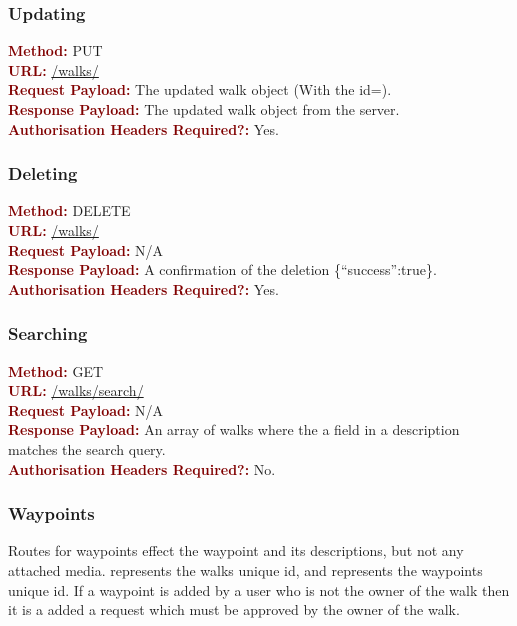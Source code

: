 \documentclass[11pt,a4paper]{report}
\begin{document}
\subsubsection{Updating}
\textbf{\textcolor{Maroon}{Method:}} PUT\\
\textbf{\textcolor{Maroon}{URL:}} \url{/walks/}\\
\textbf{\textcolor{Maroon}{Request Payload:}} The updated walk object (With the id=).\\
\textbf{\textcolor{Maroon}{Response Payload:}} The updated walk object from the server.\\
\textbf{\textcolor{Maroon}{Authorisation Headers Required?:}} Yes.

\subsubsection{Deleting}
\textbf{\textcolor{Maroon}{Method:}} DELETE\\
\textbf{\textcolor{Maroon}{URL:}} \url{/walks/}\\
\textbf{\textcolor{Maroon}{Request Payload:}} N/A\\
\textbf{\textcolor{Maroon}{Response Payload:}} A confirmation of the deletion \{``success'':true\}.\\
\textbf{\textcolor{Maroon}{Authorisation Headers Required?:}} Yes.

\subsubsection{Searching}
\textbf{\textcolor{Maroon}{Method:}} GET\\
\textbf{\textcolor{Maroon}{URL:}} \url{/walks/search/}\\
\textbf{\textcolor{Maroon}{Request Payload:}} N/A\\
\textbf{\textcolor{Maroon}{Response Payload:}} An array of walks where the a field in a description matches the search query.\\
\textbf{\textcolor{Maroon}{Authorisation Headers Required?:}} No.

\subsubsection{Waypoints}

Routes for waypoints effect the waypoint and its descriptions, but not any attached media.  represents the walks unique id, and  represents the waypoints unique id. If a waypoint is added by a user who is not the owner of the walk then it is a added a request which must be approved by the owner of the walk.
\end{document}
